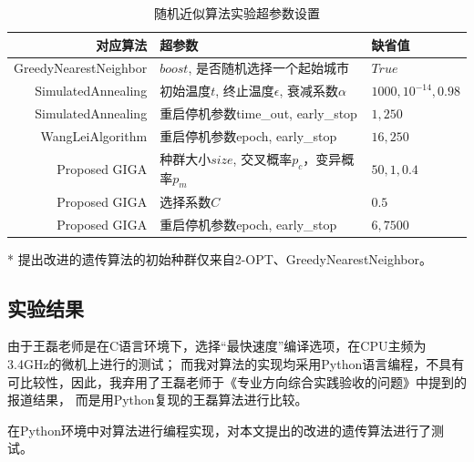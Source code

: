 \documentclass[12pt]{ctexart}
\begin{document}
\begin{table}[htbp]
    \caption{随机近似算法实验超参数设置}
    \centering

    \begin{threeparttable}
        \begin{tabular}{rll}
            \toprule
            对应算法                  & 超参数                                   & 缺省值                    \\
            \midrule
            GreedyNearestNeighbor & $boost$, 是否随机选择一个起始城市                 & $True$                 \\
            SimulatedAnnealing    & 初始温度$t$, 终止温度$\epsilon$, 衰减系数$\alpha$ & $1000, 10^{-14}, 0.98$ \\
            SimulatedAnnealing    & 重启停机参数time\_out, early\_stop          & $1, 250$               \\
            WangLeiAlgorithm      & 重启停机参数epoch, early\_stop              & $16, 250$              \\
            Proposed GIGA         & 种群大小$size$, 交叉概率$p_c$，变异概率$p_m$       & $50, 1, 0.4$           \\
            Proposed GIGA         & 选择系数$C$                               & $0.5$                  \\
            Proposed GIGA         & 重启停机参数epoch, early\_stop              & $6, 7500$              \\
            \bottomrule
        \end{tabular}
        \begin{tablenotes}
            \item [*]   提出改进的遗传算法的初始种群仅来自2-OPT、GreedyNearestNeighbor。
        \end{tablenotes}
    \end{threeparttable}
    \qquad
\end{table}

\subsection{实验结果}
由于王磊老师是在C语言环境下，选择“最快速度”编译选项，在CPU主频为3.4GHz的微机上进行的测试；
而我对算法的实现均采用Python语言编程，不具有可比较性，因此，我弃用了王磊老师于《专业方向综合实践验收的问题》中提到的报道结果，
而是用Python复现的王磊算法进行比较。

在Python环境中对算法进行编程实现，对本文提出的改进的遗传算法进行了测试。
\end{document}
